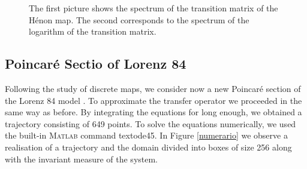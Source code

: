 \begin{figure}[H]
\begin{subfigure}[b]{0.4\textwidth}
		\label{fig:tiger}
	\end{subfigure}
	\caption{The first picture shows the spectrum of the transition matrix of the H\'{e}non map. The second corresponds to the spectrum of the logarithm of the transition matrix.}
\end{figure}

\subsection{Poincar\'{e} Sectio of Lorenz 84}

Following the study of discrete maps, we consider now a new Poincaré section of the Lorenz 84 model \cite{lorenz84}. To approximate the transfer operator we proceeded in the same way as before. By integrating the equations for long enough, we obtained a trajectory consisting of 649 points. To solve the equations numerically, we used the built-in \textsc{\textsc{Matlab}\xspace} command text{ode45}. In Figure \ref{numerario} we observe a realisation of a trajectory and the domain divided into boxes of size 256 along with the invariant measure of the system. 

